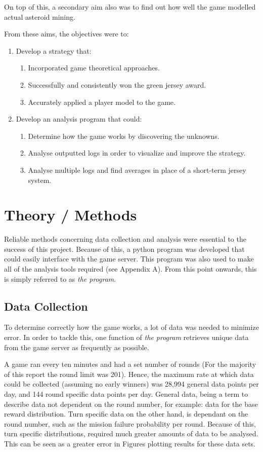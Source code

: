 \documentclass[11pt, twoside]{article}
\begin{document}
On top of this, a secondary aim also was to find out how well the game modelled actual asteroid mining.

From these aims, the objectives were to:
\begin{enumerate}
	\item Develop a strategy that:
	\begin{enumerate}
		\item Incorporated game theoretical approaches.
		\item Successfully and consistently won the green jersey award.
		\item Accurately applied a player model to the game.
	\end{enumerate}
	\item Develop an analysis program that could:
	\begin{enumerate}
		\item Determine how the game works by discovering the unknowns.
		\item Analyse outputted logs in order to visualize and improve the strategy.
		\item Analyse multiple logs and find averages in place of a short-term jersey system.
	\end{enumerate}
\end{enumerate}

\newpage

\section{Theory / Methods} \label{Methods}

Reliable methods concerning data collection and analysis were essential to the success of this project. Because of this, a python program was developed that could easily interface with the game server. This program was also used to make all of the analysis tools required (see Appendix A). From this point onwards, this is simply referred to as \textit{the program}.

\subsection{Data Collection} \label{sec:methods2}
To determine correctly how the game works, a lot of data was needed to minimize error. In order to tackle this, one function of \textit{the program} retrieves unique data from the game server as frequently as possible.

A game ran every ten minutes and had a set number of rounds (For the majority of this report the round limit was 201). Hence, the maximum rate at which data could be collected (assuming no early winners) was 28,994 general data points per day, and 144 round specific data points per day. General data, being a term to describe data not dependent on the round number, for example: data for the base reward distribution. Turn specific data on the other hand, is dependant on the round number, such as the mission failure probability per round. Because of this, turn specific distributions, required much greater amounts of data to be analysed. This can be seen as a greater error in Figures plotting results for these data sets.
\end{document}
